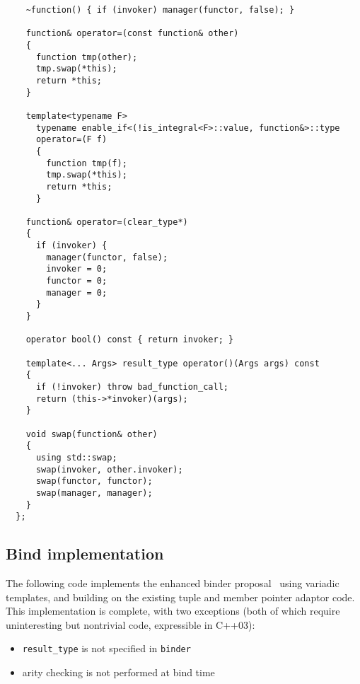 \documentclass{article}
\begin{document}
\begin{verbatim}
    ~function() { if (invoker) manager(functor, false); }

    function& operator=(const function& other)
    {
      function tmp(other);
      tmp.swap(*this);
      return *this;
    }
    
    template<typename F> 
      typename enable_if<(!is_integral<F>::value, function&>::type
      operator=(F f)
      {
        function tmp(f);
        tmp.swap(*this);
        return *this;
      }
    
    function& operator=(clear_type*)
    {
      if (invoker) { 
        manager(functor, false);
        invoker = 0;
        functor = 0;
        manager = 0;
      }
    }

    operator bool() const { return invoker; }

    template<... Args> result_type operator()(Args args) const
    {
      if (!invoker) throw bad_function_call;
      return (this->*invoker)(args);
    }
    
    void swap(function& other)
    {
      using std::swap;
      swap(invoker, other.invoker);
      swap(functor, functor);
      swap(manager, manager);
    }
  };
\end{verbatim}
\normalsize

\subsection{Bind implementation}
\label{bindimpl}
The following code implements the enhanced binder
proposal~\cite{Dimov03b} using variadic templates, and building on the
existing tuple and member pointer adaptor code. This implementation is
complete, with two exceptions (both of which require uninteresting but
nontrivial code, expressible in C++03):
\begin{itemize}
  \item {\tt result\_type} is not specified in {\tt binder}
  \item arity checking is not performed at bind time
\end{itemize}
\end{document}

